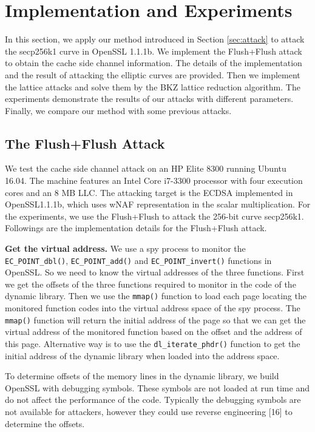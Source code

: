 \section{Implementation and Experiments}
\label{sec:impl&exper}
In this section, we apply our method introduced in Section \ref{sec:attack} to attack the secp256k1 curve in OpenSSL 1.1.1b.
  We implement the Flush+Flush attack  to obtain
the cache side channel information.
The details of the implementation and the result of attacking the elliptic curves are provided.
Then we implement the lattice attacks and solve them by the BKZ lattice reduction algorithm.
 The experiments demonstrate the results of our attacks with different parameters.
Finally, we compare our method with some previous attacks.


\subsection{The Flush+Flush Attack}
\label{ffattack}
We test the cache side channel attack on an HP Elite 8300 running Ubuntu 16.04.
The machine features an Intel Core i7-3300 processor with four execution cores and an 8 MB LLC.
The attacking target is the ECDSA implemented in OpenSSL1.1.1b, which uses wNAF representation in the scalar multiplication.
For the experiments, we use the Flush+Flush to attack the 256-bit curve secp256k1.
Followings are the implementation details for the Flush+Flush attack.


\noindent\textbf{Get the virtual address. }
We use a spy process to monitor the  \verb+EC_POINT_dbl()+,  \verb+EC_POINT_add()+ and \verb+EC_POINT_invert()+ functions in OpenSSL.
So we need to know the virtual addresses of the three functions.
First we get the offsets of the three functions required to monitor in the code of the dynamic library.
Then we use the \verb+mmap()+ function to load each page locating the monitored function codes into the virtual address space of the spy process.
The \verb+mmap()+ function will return the initial address of the page so that we can get the virtual address of the monitored function based on the offset and the address of this page.
Alternative way is to use the \verb+dl_iterate_phdr()+ function to get the initial address of the dynamic library when loaded into the address space.

To determine offsets of the memory lines in the  dynamic library,  we build OpenSSL with debugging symbols.
 These symbols are not loaded at run time and do not affect the performance of the code.
Typically the debugging symbols are not available for attackers,
 however they could use reverse engineering [16] to determine the offsets.



